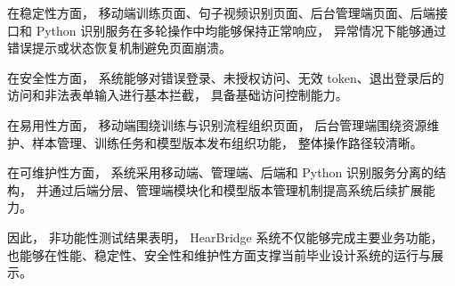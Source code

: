 在稳定性方面，
移动端训练页面、句子视频识别页面、后台管理端页面、后端接口和 Python 识别服务在多轮操作中均能够保持正常响应，
异常情况下能够通过错误提示或状态恢复机制避免页面崩溃。

在安全性方面，
系统能够对错误登录、未授权访问、无效 token、退出登录后的访问和非法表单输入进行基本拦截，
具备基础访问控制能力。

在易用性方面，
移动端围绕训练与识别流程组织页面，
后台管理端围绕资源维护、样本管理、训练任务和模型版本发布组织功能，
整体操作路径较清晰。

在可维护性方面，
系统采用移动端、管理端、后端和 Python 识别服务分离的结构，
并通过后端分层、管理端模块化和模型版本管理机制提高系统后续扩展能力。

因此，
非功能性测试结果表明，
HearBridge 系统不仅能够完成主要业务功能，
也能够在性能、稳定性、安全性和维护性方面支撑当前毕业设计系统的运行与展示。
